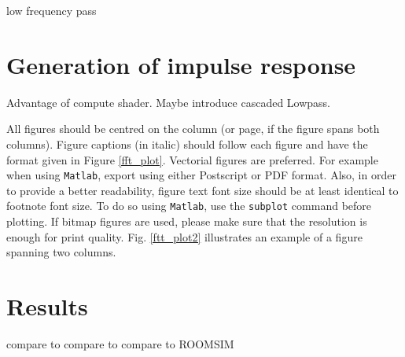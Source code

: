 \documentclass[twoside,a4paper]{article}
\begin{document}
low frequency pass

\section{Generation of impulse response}

Advantage of compute shader.
Maybe introduce cascaded Lowpass.



All figures should be centred on the column (or page, if the figure spans both columns).
Figure captions (in italic) should follow each figure and have the format given in Figure \ref{fft_plot}.
%
Vectorial figures are preferred. For example when using
\texttt{Matlab}, export using either Postscript or PDF format. Also,
in order to provide a better readability, figure text font size
should be at least identical to footnote font size. To do so using
\texttt{Matlab}, use the \texttt{subplot} command before plotting.
If bitmap figures are used, please make sure that the resolution is
enough for print quality. Fig. \ref{ftt_plot2} illustrates an
example of a figure spanning two columns.
%

\section{Results}

compare to \cite{brinkmann_round_2019}
compare to \cite{campbell_roomsim_nodate}
compare to ROOMSIM
\end{document}
